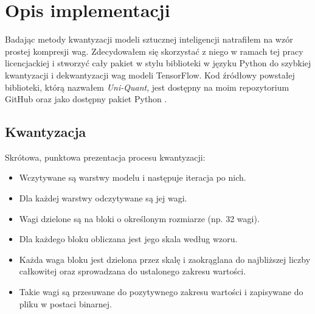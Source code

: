 \section{Opis implementacji}
 Badając metody kwantyzacji modeli sztucznej inteligencji natrafiłem na wzór prostej kompresji wag. Zdecydowałem się skorzystać z niego w ramach tej pracy licencjackiej i stworzyć cały pakiet w stylu biblioteki w języku Python do szybkiej kwantyzacji i dekwantyzacji wag modeli TensorFlow.
Kod źródłowy powstałej biblioteki, którą nazwałem \textit{Uni-Quant}, jest dostępny na moim repozytorium GitHub \cite{qbsoon2025uniquant} oraz jako dostępny pakiet Python \cite{qbsoon2026uniquant-pypi}.
\subsection{Kwantyzacja}
Skrótowa, punktowa prezentacja procesu kwantyzacji:
\begin{itemize}
    \item Wczytywane są warstwy modelu i następuje iteracja po nich.
    \item Dla każdej warstwy odczytywane są jej wagi.
    \item Wagi dzielone są na bloki o określonym rozmiarze (np. 32 wagi).
    \item Dla każdego bloku obliczana jest jego skala według wzoru.
    \item Każda waga bloku jest dzielona przez skalę i zaokrąglana do najbliższej liczby całkowitej oraz sprowadzana do ustalonego zakresu wartości.
    \item Takie wagi są przesuwane do pozytywnego zakresu wartości i zapisywane do pliku w postaci binarnej.
\end{itemize}

